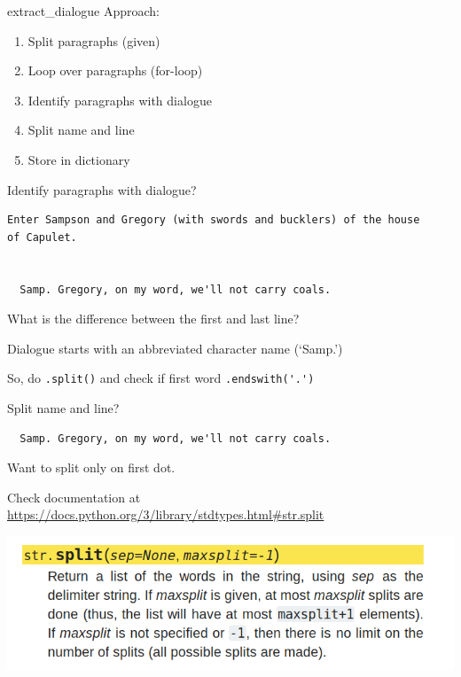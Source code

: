 \documentclass[aspectratio=169,usenames,dvipsnames]{beamer}
\begin{document}
\begin{frame}[fragile]{extract\_dialogue}
    Approach:
    \begin{enumerate}
        \item Split paragraphs (given)
        \item Loop over paragraphs (for-loop)
        \item Identify paragraphs with dialogue
        \item Split name and line
        \item Store in dictionary
    \end{enumerate}
\end{frame}

\begin{frame}[fragile]{Identify paragraphs with dialogue?}
\begin{verbatim}
Enter Sampson and Gregory (with swords and bucklers) of the house
of Capulet.


  Samp. Gregory, on my word, we'll not carry coals.
\end{verbatim}

    \vspace{1em}
    What is the difference between the first and last line?

    \pause
    Dialogue starts with an abbreviated character name (`Samp.')
    
    \vspace{1em}
    So, do \lstinline{.split()} and check if first word \lstinline{.endswith('.')}
\end{frame}

\begin{frame}[fragile]{Split name and line?}
\begin{verbatim}
  Samp. Gregory, on my word, we'll not carry coals.
\end{verbatim}

    \vspace{1em}
    Want to split only  on first dot.

    \vspace{1em}
    Check documentation at \url{https://docs.python.org/3/library/stdtypes.html\#str.split}

    \vspace{1em}
    \centering
    \includegraphics[width=0.9\linewidth]{fig/splitdocs}
\end{frame}
\end{document}
